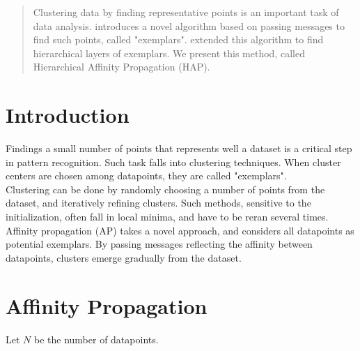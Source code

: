 \documentclass{ipol}
\begin{document}
\begin{abstract}

Clustering data by finding representative points is an important task of data
analysis. \cite{frey07affinitypropagation} introduces a novel algorithm based
on passing messages to find such points, called "exemplars". \cite{hap}
extended this algorithm to find hierarchical layers of exemplars. We present
this method, called Hierarchical Affinity Propagation (HAP).

\end{abstract}

\begin{ipolCode}
\end{ipolCode}

\begin{ipolSupp}
\end{ipolSupp}

\section{Introduction}

Findings a small number of points that represents well a dataset is a critical
step in pattern recognition. Such task falls into clustering techniques. When
cluster centers are chosen among datapoints, they are called "exemplars". \\
Clustering can be done by randomly choosing a number of points from
the dataset, and iteratively refining clusters. Such methods, sensitive to the
initialization, often fall in local minima, and have to be reran several
times. \\
Affinity propagation (AP) takes a novel approach, and considers all datapoints
as potential exemplars. By passing messages reflecting the affinity between
datapoints, clusters emerge gradually from the dataset. \\

\section{Affinity Propagation}
Let $N$ be the number of datapoints.
\end{document}
